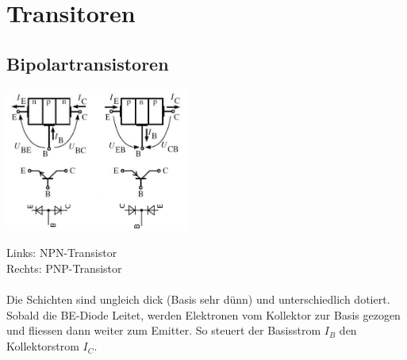 \section{Transitoren}

\subsection{Bipolartransistoren}
	\begin{minipage}[c]{6cm}
		\includegraphics[width=6cm]{images/bipolarTransistor-Aufbau}
	\end{minipage}
	\begin{minipage}[c]{12cm}
		Links: NPN-Transistor \\
		Rechts: PNP-Transistor \\
		\\
		Die Schichten sind ungleich dick (Basis sehr dünn) und unterschiedlich dotiert.
		Sobald die BE-Diode Leitet, werden Elektronen vom Kollektor zur Basis gezogen und
		fliessen dann weiter zum Emitter. So steuert der Basisstrom $I_B$ den 
		Kollektorstrom $I_C$. \\
	\end{minipage} \\
	
